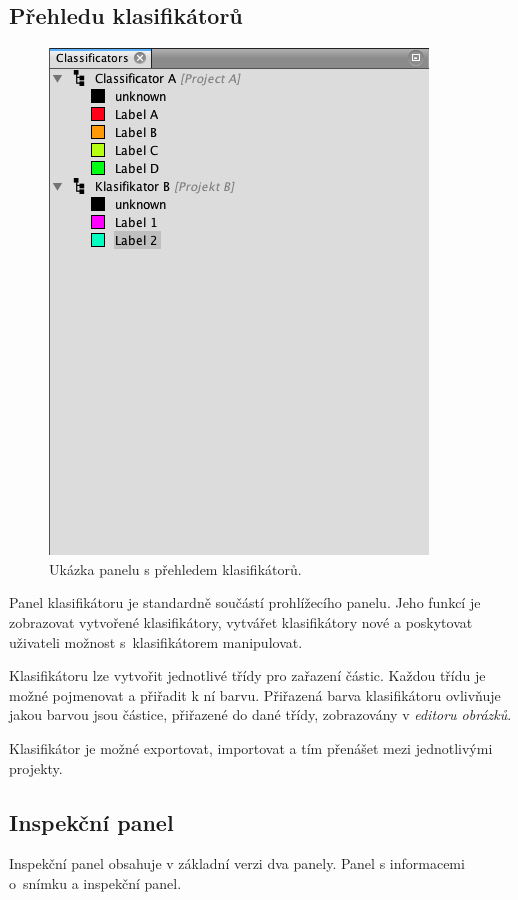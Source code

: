 \documentclass[11pt,twoside,a4paper,table]{book}
\begin{document}
\subsection{Přehledu klasifikátorů}
\begin{figure}[h]
	\centering
	\includegraphics[scale=0.5]{figures/app_class_overview.png}
	\caption{Ukázka panelu s přehledem klasifikátorů.}
\end{figure}

Panel klasifikátoru je standardně součástí prohlížecího panelu. Jeho funkcí je zobrazovat vytvořené klasifikátory, vytvářet klasifikátory nové a poskytovat uživateli možnost s~klasifikátorem manipulovat.

Klasifikátoru lze vytvořit jednotlivé třídy pro zařazení částic. Každou třídu je možné pojmenovat a přiřadit k ní barvu. Přiřazená barva klasifikátoru ovlivňuje jakou barvou jsou částice, přiřazené do dané třídy, zobrazovány v \textit{editoru obrázků}.

Klasifikátor je možné exportovat, importovat a tím přenášet mezi jednotlivými projekty.

\subsection{Inspekční panel}
Inspekční panel obsahuje v základní verzi dva panely. Panel s informacemi o~snímku a inspekční panel.
\end{document}
